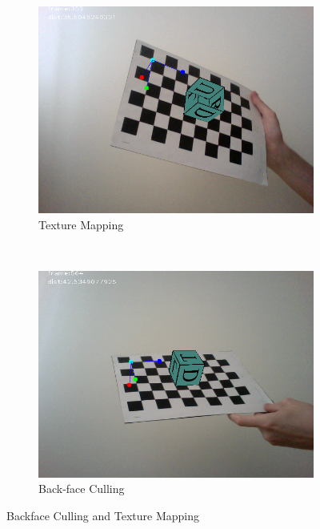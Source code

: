  \begin{figure}[h!]
	\begin{subfigure}[b]{0.5\textwidth}
		\includegraphics[width=\textwidth]{final/images/culling.png}
		\caption{Texture Mapping}
		\label{subfig:texture}
	\end{subfigure}
	~
	\begin{subfigure}[b]{0.5\textwidth}
		\includegraphics[width=\textwidth]{final/images/texture2.png}
		\caption{Back-face Culling}
		\label{subfig:backculling}
	\end{subfigure}
	
	\label{fig:texturing}
	\caption{Backface Culling and Texture Mapping}
\end{figure}

